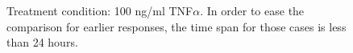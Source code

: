 \documentclass{bmcart}
\renewcommand*\thesubfigure{\Alph{subfigure}}
\begin{document}
\renewcommand*\thesubfigure{}
\begin{figure}[!tpb]
\begin{minipage}{\textwidth}
\begin{center}
\end{center}
\caption{ Treatment condition: 100 ng/ml TNF$\alpha$.
In order to ease the comparison for earlier responses, the time span for those cases is less than 24 hours.}\label{fig:differences1}
\end{minipage}
\end{figure}
\end{document}
